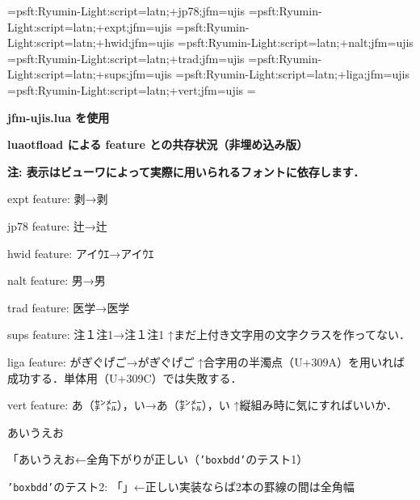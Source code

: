 

\let\tengoth=\tengt
\jfont\jisse={psft:Ryumin-Light:script=latn;+jp78;jfm=ujis}
\jfont\jisexpt={psft:Ryumin-Light:script=latn;+expt;jfm=ujis}
\jfont\jishwid={psft:Ryumin-Light:script=latn;+hwid;jfm=ujis}
\jfont\jisnalt={psft:Ryumin-Light:script=latn;+nalt;jfm=ujis}
\jfont\jistrad={psft:Ryumin-Light:script=latn;+trad;jfm=ujis}
\jfont\jissups={psft:Ryumin-Light:script=latn;+sups;jfm=ujis}
\jfont\jisliga={psft:Ryumin-Light:script=latn;+liga;jfm=ujis}
\jfont\jisvert={psft:Ryumin-Light:script=latn;+vert;jfm=ujis}
\parskip=\smallskipamount{}\zw

{\noindent\bf\tengoth jfm-ujis.lua を使用}

\bigskip

{\noindent\bf\tengoth luaotf\/load による feature との共存状況（非埋め込み版）}

{\noindent\bf\tengoth 注: 表示はビューワによって実際に用いられるフォントに依存します．}

{\tentt expt} feature: 剥→{\jisexpt 剥}

{\tentt jp78} feature: 辻→{\jisse 辻}

{\tentt hwid} feature: アイｳｴ→{\jishwid アイｳｴ}\hfil\break

{\tentt nalt} feature: 男→{\jisnalt 男}

{\tentt trad} feature: 医学→{\jistrad 医学}

{\tentt sups} feature: 注１注1→{\jissups 注１注1}\hfil\break
↑まだ上付き文字用の文字クラスを作ってない．

{\tentt liga} feature: か゚き゚く゚け゚こ゚→{\jisliga か゚き゚く゚け゚こ゚}\hfil\break
↑合字用の半濁点（{\tentt U+309A}）を用いれば成功する．単体用（{\tentt U+309C}）では失敗する．%

{\tentt vert} feature: あ（㌢㍍），い→{\jisvert あ（㌢㍍），い}\hfil\break
↑縦組み時に気にすればいいか．

\bigskip

\noindent あいうえお

「あいうえお←全角下がりが正しい（{\tt'boxbdd'}のテスト1）

{\tt'boxbdd'}のテスト2: \vrule\hbox{「」}\vrule ←正しい実装ならば2本の罫線の間は全角幅


